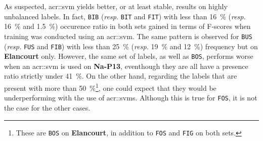         As suspected, \gls{acr::svm} yields better, or at least stable, results on highly unbalanced labels.
        In fact, \texttt{BIB} (\textit{resp.} \texttt{BIT} and \texttt{FIT}) with less than \SI{16}{\percent} (\textit{resp.} \SI{16}{\percent} and \SI{1.5}{\percent}) occurence ratio in both sets gained in terms of F-scores when training was conducted using an \gls{acr::svm}.
        The same pattern is observed for \texttt{BUS} (\textit{resp.} \texttt{FUS} and \texttt{FIB}) with less than \SI{25}{\percent} (\textit{resp.} \SI{19}{\percent} and \SI{12}{\percent}) frequency but on \textbf{Elancourt} only.
        However, the same set of labels, as well as \texttt{BOS}, performs worse when an \gls{acr::svm} is used on \textbf{Na-P13}, eventhough they are all have a presence ratio strictly under \SI{41}{\percent}.
        On the other hand, regarding the labels that are present with more than \SI{50}{\percent}\footnote{
            These are \texttt{BOS} on \textbf{Elancourt}, in addition to \texttt{FOS} and \texttt{FIG} on both sets.
        }, one could expect that they would be underperforming with the use of \glspl{acr::svm}.
        Although this is true for \texttt{FOS}, it is not the case for the other cases.\\

